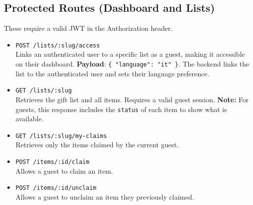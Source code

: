 \subsection{Protected Routes (Dashboard and Lists)}
These require a valid JWT in the Authorization header.
\begin{itemize}
    \item \texttt{POST /lists/:slug/access} \\
    Links an authenticated user to a specific list as a guest, making it accessible on their dashboard.
    \textbf{Payload}: \texttt{\{ "language": "it" \}}.
    The backend links the list to the authenticated user and sets their language preference.
    \item \texttt{GET /lists/:slug} \\
    Retrieves the gift list and all items. Requires a valid guest session. \textbf{Note:} For guests, this response includes the \texttt{status} of each item to show what is available.
    \item \texttt{GET /lists/:slug/my-claims} \\
    Retrieves only the items claimed by the current guest.
    \item \texttt{POST /items/:id/claim} \\
    Allows a guest to claim an item.
    \item \texttt{POST /items/:id/unclaim} \\
    Allows a guest to unclaim an item they previously claimed.
\end{itemize}

